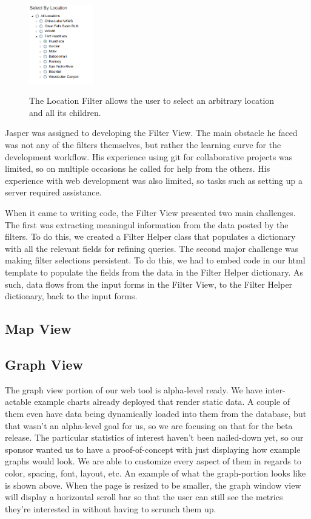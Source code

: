 \documentclass[10pt,peerreview,onecolumn,draftclsnofoot,technote]{IEEEtran}
\begin{document}
\begin{figure}[h]
\caption{
  The Location Filter allows the user to select an arbitrary location and all its children.
}
\centering
\includegraphics[width=0.25\textwidth]{images/location_filter.png}
\label{fig:location_filter}
\end{figure}

Jasper was assigned to developing the Filter View.
The main obstacle he faced was not any of the filters themselves, but rather the learning curve for the development workflow.
His experience using git for collaborative projects was limited, so on multiple occasions he called for help from the others.
His experience with web development was also limited, so tasks such as setting up a server required assistance.

When it came to writing code, the Filter View presented two main challenges.
The first was extracting meaningul information from the data posted by the filters.
To do this, we created a Filter Helper class that populates a dictionary with all the relevant fields for refining queries.
The second major challenge was making filter selections persistent.
To do this, we had to embed code in our html template to populate the fields from the data in the Filter Helper dictionary.
As such, data flows from the input forms in the Filter View, to the Filter Helper dictionary, back to the input forms.

\subsection{Map View}

\subsection{Graph View} %
The graph view portion of our web tool is alpha-level ready.
We have inter-actable example charts already deployed that render  static data.
A couple of them even have data being dynamically loaded into them from the database, but that wasn’t an alpha-level goal for us, so we are focusing on that for the beta release.
The particular statistics of interest haven’t been nailed-down yet, so our sponsor wanted us to have a proof-of-concept with just displaying how example graphs would look.
We are able to customize every aspect of them in regards to color, spacing, font, layout, etc.
An example of what the graph-portion looks like is shown above.
When the page is resized to be smaller, the graph window view will display a horizontal scroll bar so that the user can still see the metrics they’re interested in without having to scrunch them up.
\end{document}

